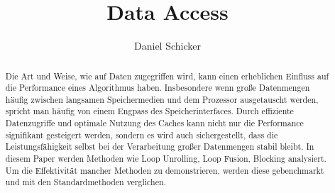 \documentclass[sigconf,language=english]{acmart}
\begin{document}
\title{Data Access}



\author{Daniel Schicker}

\begin{abstract}
    Die Art und Weise, wie auf Daten zugegriffen wird,
    kann einen erheblichen Einfluss auf die Performance eines Algorithmus haben.
    Insbesondere wenn große Datenmengen häufig zwischen langsamen Speichermedien und dem Prozessor ausgetauscht werden,
    spricht man häufig von einem Engpass des Speicherinterfaces.
    Durch effiziente Datenzugriffe und optimale Nutzung des Caches 
    kann nicht nur die Performance signifikant gesteigert werden, 
    sondern es wird auch sichergestellt, 
    dass die Leistungsfähigkeit selbst bei der Verarbeitung großer Datenmengen stabil bleibt.
    In diesem Paper werden Methoden wie Loop Unrolling, Loop Fusion, Blocking analysiert.
    Um die Effektivität mancher Methoden zu demonstrieren, werden diese gebenchmarkt und mit den Standardmethoden verglichen.
\end{abstract}

\maketitle

\lstset{
  basicstyle = \ttfamily,
  frame = single,
  breaklines = true,
}
\end{document}
